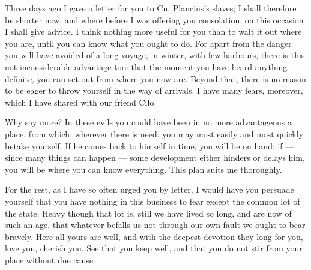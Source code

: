 

 Three days ago I gave a letter for you to Cn. Plancius's slaves; I shall therefore be shorter now, and where before I was offering you consolation, on this occasion I shall give advice. I think nothing more useful for you than to wait it out where you are, until you can know what you ought to do. For apart from the danger you will have avoided of a long voyage, in winter, with few harbours, there is this not inconsiderable advantage too: that the moment you have heard anything definite, you can set out from where you now are. Beyond that, there is no reason to be eager to throw yourself in the way of arrivals. I have many fears, moreover, which I have shared with our friend Cilo.

 Why say more? In these evils you could have been in no more advantageous a place, from which, wherever there is need, you may most easily and most quickly betake yourself. If he comes back to himself in time, you will be on hand; if --- since many things can happen --- some development either hinders or delays him, you will be where you can know everything. This plan suits me thoroughly.

 For the rest, as I have so often urged you by letter, I would have you persuade yourself that you have nothing in this business to fear except the common lot of the state. Heavy though that lot is, still we have lived so long, and are now of such an age, that whatever befalls us not through our own fault we ought to bear bravely. Here all yours are well, and with the deepest devotion they long for you, love you, cherish you. See that you keep well, and that you do not stir from your place without due cause.
